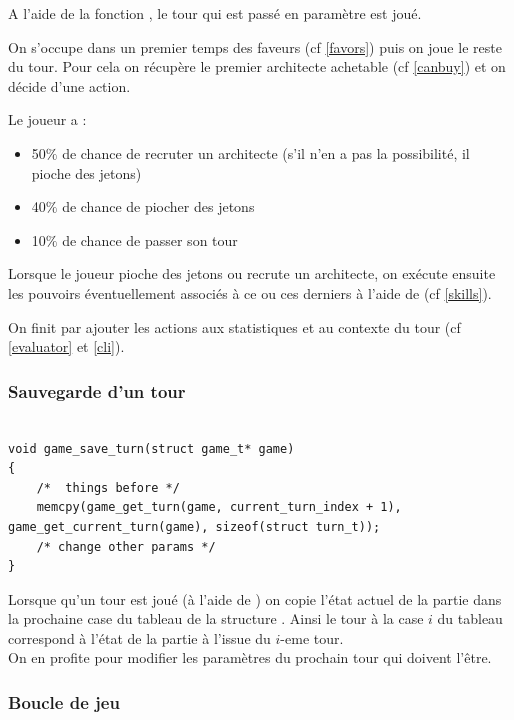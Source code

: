 A l'aide de la fonction , le tour qui est passé en paramètre est joué.

On s'occupe dans un premier temps des faveurs (cf \ref{favors}) puis on joue le reste du tour. Pour cela on récupère le premier architecte achetable (cf \ref{canbuy}) et on décide d'une action.

\noindent Le joueur a :
\begin{itemize}
    \item 50$\%$ de chance de recruter un architecte (s'il n'en a pas la possibilité, il pioche des jetons)
    \item 40$\%$ de chance de piocher des jetons
    \item 10$\%$ de chance de passer son tour
\end{itemize}

Lorsque le joueur pioche des jetons ou recrute un architecte, on exécute ensuite les pouvoirs éventuellement associés à ce ou ces derniers à l'aide de  (cf \ref{skills}).

On finit par ajouter les actions aux statistiques et au contexte du tour (cf \ref{evaluator} et \ref{cli}).


\subsubsection*{Sauvegarde d'un tour}


\begin{lstlisting}[frame=single, caption={Sauvegarde d'un tour}, label=save]

void game_save_turn(struct game_t* game)
{
    /*  things before */
	memcpy(game_get_turn(game, current_turn_index + 1), game_get_current_turn(game), sizeof(struct turn_t));	
    /* change other params */
}
\end{lstlisting}

Lorsque qu'un tour est joué (à l'aide de ) on copie l'état actuel de la partie dans la prochaine case du tableau  de la structure . Ainsi le tour à la case $i$ du tableau correspond à l'état de la partie à l'issue du $i$-eme tour. \\
On en profite pour modifier les paramètres du prochain tour qui doivent l'être.

\subsubsection*{Boucle de jeu}

